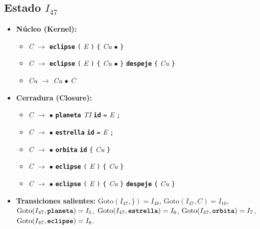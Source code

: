 \documentclass[12pt, letterpaper]{article}
\begin{document}
\subsection*{Estado $I_{47}$ }
\begin{itemize}\setlength{\itemsep}{1pt}\setlength{\parskip}{0pt}
\item \textbf{Núcleo (Kernel):}
\begin{itemize}\setlength{\itemsep}{1pt}\setlength{\parskip}{0pt}
    \item \textit{C} $\to$ \textbf{\texttt{eclipse}} \texttt{(} \textit{E} \texttt{)} \texttt{\{} \textit{Cu} $\bullet$ \texttt{\}}
    \item \textit{C} $\to$ \textbf{\texttt{eclipse}} \texttt{(} \textit{E} \texttt{)} \texttt{\{} \textit{Cu} $\bullet$ \texttt{\}} \textbf{\texttt{despeje}} \texttt{\{} \textit{Cu} \texttt{\}}
    \item \textit{Cu} $\to$ \textit{Cu} $\bullet$ \textit{C}
\end{itemize}
\item \textbf{Cerradura (Closure):}
\begin{itemize}\setlength{\itemsep}{1pt}\setlength{\parskip}{0pt}
    \item \textit{C} $\to$ $\bullet$ \textbf{\texttt{planeta}} \textit{TI} \textbf{\texttt{id}} \texttt{=} \textit{E} \texttt{;}
    \item \textit{C} $\to$ $\bullet$ \textbf{\texttt{estrella}} \textbf{\texttt{id}} \texttt{=} \textit{E} \texttt{;}
    \item \textit{C} $\to$ $\bullet$ \textbf{\texttt{orbita}} \textbf{\texttt{id}} \texttt{\{} \textit{Cu} \texttt{\}}
    \item \textit{C} $\to$ $\bullet$ \textbf{\texttt{eclipse}} \texttt{(} \textit{E} \texttt{)} \texttt{\{} \textit{Cu} \texttt{\}}
    \item \textit{C} $\to$ $\bullet$ \textbf{\texttt{eclipse}} \texttt{(} \textit{E} \texttt{)} \texttt{\{} \textit{Cu} \texttt{\}} \textbf{\texttt{despeje}} \texttt{\{} \textit{Cu} \texttt{\}}
\end{itemize}
\item \textbf{Transiciones salientes:} $\text{Goto}(I_{47}, \texttt{\}}) = I_{48}$, \quad $\text{Goto}(I_{47}, \textit{C}) = I_{10}$, \quad $\text{Goto}(I_{47}, \textbf{\texttt{planeta}}) = I_{5}$, \quad $\text{Goto}(I_{47}, \textbf{\texttt{estrella}}) = I_{6}$, \quad $\text{Goto}(I_{47}, \textbf{\texttt{orbita}}) = I_{7}$, \quad $\text{Goto}(I_{47}, \textbf{\texttt{eclipse}}) = I_{8}$.
\end{itemize}
\vspace{2pt}
\end{document}
